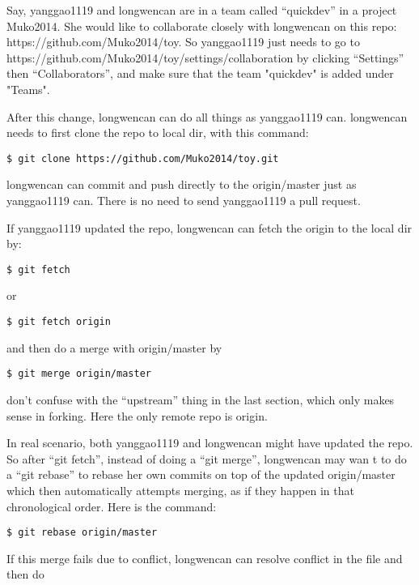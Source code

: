 \documentclass{article} %
\newcommand{\q}[1]{``#1''}
\begin{document}
Say, yanggao1119 and longwencan are in a team called \q{quickdev} in a project Muko2014. She would like to collaborate closely with longwencan on this repo: https://github.com/Muko2014/toy. So yanggao1119 just needs to go to https://github.com/Muko2014/toy/settings/collaboration by clicking \q{Settings} then \q{Collaborators}, and make sure that the team "quickdev" is added under "Teams".

After this change, longwencan can do all things as yanggao1119 can. longwencan needs to first clone the repo to local dir, with this command:

\begin{lstlisting}
$ git clone https://github.com/Muko2014/toy.git
\end{lstlisting}

longwencan can commit and push directly to the origin/master just as yanggao1119 can. There is no need to send yanggao1119 a pull request.

If yanggao1119 updated the repo, longwencan can fetch the origin to the local dir by:

\begin{lstlisting}
$ git fetch
\end{lstlisting}

or 

\begin{lstlisting}
$ git fetch origin
\end{lstlisting}

and then do a merge with origin/master by

\begin{lstlisting}
$ git merge origin/master
\end{lstlisting}

don't confuse with the \q{upstream} thing in the last section, which only makes sense in forking. Here the only remote repo is origin.

In real scenario, both yanggao1119 and longwencan might have updated the repo. So after \q{git fetch}, instead of doing a \q{git merge}, longwencan may wan t to do a \q{git rebase} to rebase her own commits on top of the updated origin/master which then automatically attempts merging, as if they happen in that chronological order. Here is the command:

\begin{lstlisting}
$ git rebase origin/master
\end{lstlisting}

If this merge fails due to conflict, longwencan can resolve conflict in the file and then do 
\end{document}
